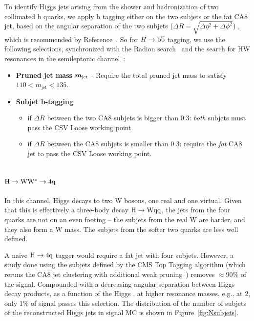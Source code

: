 To identify Higgs jets arising from the shower and hadronization of two 
collimated b quarks, we apply b tagging either on the two subjets or the
fat CA8 jet, based on the angular separation of the two subjets
($\Delta R = \sqrt{ \Delta \eta^2 + \Delta \phi^2 }$)
, which is 
recommended by Reference~\cite{BTV-13-001}. 
So for $H\to\mathrm{b\overline{b}}$ tagging, we use the following selections, synchronized with
the Radion search~\cite{HH4b} and the search for HW 
resonances in the semileptonic channel~\cite{HWlv}:
\begin{itemize}

\item {\bf Pruned jet mass}  $\mbox{\boldmath$m_{\text{jet}}$}$
  - Require the total pruned jet mass to satisfy $110 < m_\text{jet} <  135$\GeVcc.

\item {\bf Subjet b-tagging}
        \begin{itemize}
	\item if $\Delta R$ between the two CA8 subjets is bigger than 0.3: 
  		{\it both} subjets must pass the CSV Loose working point.
	\item if $\Delta R$ between the CA8 subjets is smaller than 0.3:
		require the {\it fat} CA8 jet to pass the CSV Loose working point. 
        \end{itemize}

\end{itemize}



\subsection{${\rm H \to WW^* \to 4q}$}
\label{sec:higgsTaggerww}


In this channel, Higgs decays to two W bosons, one real and one
virtual.  Given that this is effectively a
three-body decay ${\rm H\to Wqq}$, the jets from the four quarks are
not on an even footing -- the subjets from the real W are harder, and
they also form a W mass.  The subjets from the softer two quarks are
less well defined.

A naive ${\rm H \to 4q}$ tagger would require a fat jet with four subjets. 
However, a study done using the subjets defined by the CMS Top Tagging
algorithm (which reruns the CA8 jet clustering with additional weak 
pruning~\cite{cmstoptagging}) removes $\approx 90\%$ of the signal.   
Compounded with a decreasing angular separation
between Higgs decay products, 
 as a function of the Higgs \pt, at higher 
resonance masses, e.g., at 2\TeVcc, only 1\% of signal 
passes this selection. 
The distribution of the number of subjets of the reconstructed Higgs jets 
in signal MC is shown 
in Figure~\ref{fig:Nsubjets}. 

